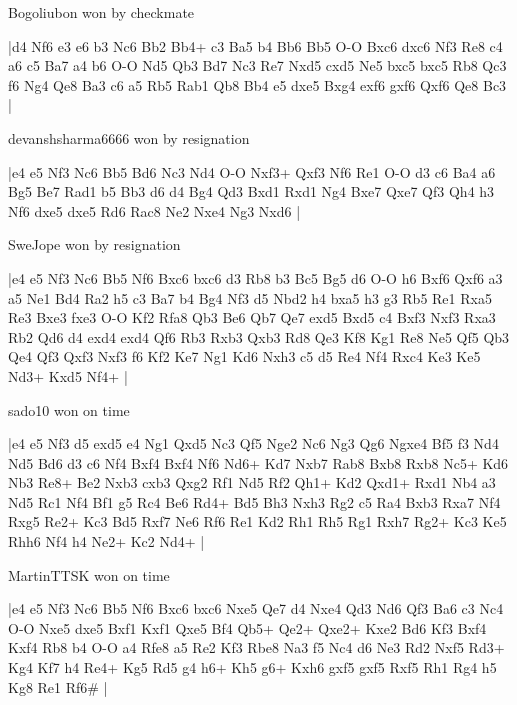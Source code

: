 Bogoliubon won by checkmate

\makegametitle
|d4 Nf6 e3 e6 b3 Nc6 Bb2 Bb4+ c3 Ba5 b4 Bb6 Bb5 O-O Bxc6 dxc6 Nf3 Re8 c4 a6 c5 Ba7 a4 b6 O-O Nd5 Qb3 Bd7 Nc3 Re7 Nxd5 cxd5 Ne5 bxc5 bxc5 Rb8 Qc3 f6 Ng4 Qe8 Ba3 c6 a5 Rb5 Rab1 Qb8 Bb4 e5 dxe5 Bxg4 exf6 gxf6 Qxf6 Qe8 Bc3  |

\showboard

devanshsharma6666 won by resignation

\makegametitle
|e4 e5 Nf3 Nc6 Bb5 Bd6 Nc3 Nd4 O-O Nxf3+ Qxf3 Nf6 Re1 O-O d3 c6 Ba4 a6 Bg5 Be7 Rad1 b5 Bb3 d6 d4 Bg4 Qd3 Bxd1 Rxd1 Ng4 Bxe7 Qxe7 Qf3 Qh4 h3 Nf6 dxe5 dxe5 Rd6 Rac8 Ne2 Nxe4 Ng3 Nxd6  |

\showboard

SweJope won by resignation

\makegametitle
|e4 e5 Nf3 Nc6 Bb5 Nf6 Bxc6 bxc6 d3 Rb8 b3 Bc5 Bg5 d6 O-O h6 Bxf6 Qxf6 a3 a5 Ne1 Bd4 Ra2 h5 c3 Ba7 b4 Bg4 Nf3 d5 Nbd2 h4 bxa5 h3 g3 Rb5 Re1 Rxa5 Re3 Bxe3 fxe3 O-O Kf2 Rfa8 Qb3 Be6 Qb7 Qe7 exd5 Bxd5 c4 Bxf3 Nxf3 Rxa3 Rb2 Qd6 d4 exd4 exd4 Qf6 Rb3 Rxb3 Qxb3 Rd8 Qe3 Kf8 Kg1 Re8 Ne5 Qf5 Qb3 Qe4 Qf3 Qxf3 Nxf3 f6 Kf2 Ke7 Ng1 Kd6 Nxh3 c5 d5 Re4 Nf4 Rxc4 Ke3 Ke5 Nd3+ Kxd5 Nf4+  |

\showboard

sado10 won on time

\makegametitle
|e4 e5 Nf3 d5 exd5 e4 Ng1 Qxd5 Nc3 Qf5 Nge2 Nc6 Ng3 Qg6 Ngxe4 Bf5 f3 Nd4 Nd5 Bd6 d3 c6 Nf4 Bxf4 Bxf4 Nf6 Nd6+ Kd7 Nxb7 Rab8 Bxb8 Rxb8 Nc5+ Kd6 Nb3 Re8+ Be2 Nxb3 cxb3 Qxg2 Rf1 Nd5 Rf2 Qh1+ Kd2 Qxd1+ Rxd1 Nb4 a3 Nd5 Rc1 Nf4 Bf1 g5 Rc4 Be6 Rd4+ Bd5 Bh3 Nxh3 Rg2 c5 Ra4 Bxb3 Rxa7 Nf4 Rxg5 Re2+ Kc3 Bd5 Rxf7 Ne6 Rf6 Re1 Kd2 Rh1 Rh5 Rg1 Rxh7 Rg2+ Kc3 Ke5 Rhh6 Nf4 h4 Ne2+ Kc2 Nd4+  |

\showboard

MartinTTSK won on time

\makegametitle
|e4 e5 Nf3 Nc6 Bb5 Nf6 Bxc6 bxc6 Nxe5 Qe7 d4 Nxe4 Qd3 Nd6 Qf3 Ba6 c3 Nc4 O-O Nxe5 dxe5 Bxf1 Kxf1 Qxe5 Bf4 Qb5+ Qe2+ Qxe2+ Kxe2 Bd6 Kf3 Bxf4 Kxf4 Rb8 b4 O-O a4 Rfe8 a5 Re2 Kf3 Rbe8 Na3 f5 Nc4 d6 Ne3 Rd2 Nxf5 Rd3+ Kg4 Kf7 h4 Re4+ Kg5 Rd5 g4 h6+ Kh5 g6+ Kxh6 gxf5 gxf5 Rxf5 Rh1 Rg4 h5 Kg8 Re1 Rf6\#  |

